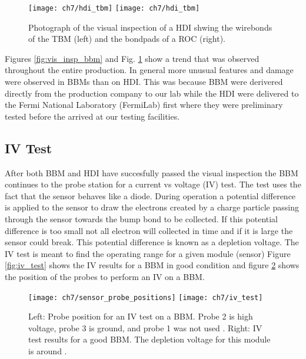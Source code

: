 \begin{figure}[!h]
  \centering
  \texttt{[image: ch7/hdi\_tbm]}
  \texttt{[image: ch7/hdi\_tbm]}
  \caption[Visual inspection of a HDI.]{Photograph of the visual inspection of a HDI shwing the wirebonds of the TBM (left) and the bondpads of a ROC (right). {}}\label{fig:vis_insp_hdi}
\end{figure}

Figures \ref{fig:vis_insp_bbm} and Fig. \ref{fig:vis_insp_hdi} show a trend that was observed throughout the entire production. In general more unusual features and damage were observed in BBMs than on HDI. This was because BBM were derivered directly from the production company to our lab while the HDI were delivered to the Fermi National Laboratory (FermiLab) first where they were preliminary tested before the arrived at our testing facilities. 

\subsection{IV Test}\label{ivbbm}
After both BBM and HDI have succesfully passed the visual inspection the BBM continues to the probe station for a current vs voltage (IV) test. The test uses the fact that the sensor behaves like a diode. During operation a potential difference is applied to the sensor to draw the electrons created by a charge particle passing through the sensor towards the bump bond to be collected. If this potential difference is too small not all electron will collected in time and if it is large the sensor could break. This potential difference is known as a depletion voltage. The IV test is meant to find the operating range for a given module (sensor) Figure \ref{fig:iv_test} shows the IV results for a BBM in good condition and figure \ref{fig:sensor_probe_positions} shows the position of the probes to perform an IV on a BBM.  

\begin{figure}[!h]
  \centering
  \texttt{[image: ch7/sensor\_probe\_positions]}
  \texttt{[image: ch7/iv\_test]}
  \caption[IV test of BBM]{Left: Probe position for an IV test on a BBM. Probe 2 is high voltage, probe 3 is ground, and probe 1 was not used \cite{ph1_sop}. Right: IV test results for a good BBM. The depletion voltage for this module is around {}.}\label{fig:sensor_probe_positions}
\end{figure}










